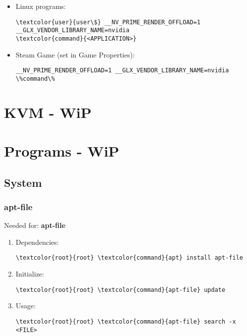 \documentclass[10pt, a4paper, onecolumn, openany]{book} %
\begin{document}
\begin{enumerate}
\begin{itemize}
    \item Linux programs:
\begin{Verbatim}[commandchars=\\\{\}]
\textcolor{user}{user\$} __NV_PRIME_RENDER_OFFLOAD=1 __GLX_VENDOR_LIBRARY_NAME=nvidia 
\textcolor{command}{<APPLICATION>}
\end{Verbatim}
    \item Steam Game (set in Game Properties):
\begin{Verbatim}[commandchars=\\\{\}]
__NV_PRIME_RENDER_OFFLOAD=1 __GLX_VENDOR_LIBRARY_NAME=nvidia \%command\%
\end{Verbatim}
\end{itemize}
\end{enumerate}
\chapter{KVM - WiP}
\chapter{Programs - WiP}
\section{System}
\subsection{apt-file}
Needed for: \textbf{apt-file}
\begin{enumerate}
    \item Dependencies:
\begin{Verbatim}[commandchars=\\\{\}]
\textcolor{root}{root} \textcolor{command}{apt} install apt-file
\end{Verbatim}
    \item Initialize:
\begin{Verbatim}[commandchars=\\\{\}]
\textcolor{root}{root} \textcolor{command}{apt-file} update
\end{Verbatim}
    \item Usage:
\begin{Verbatim}[commandchars=\\\{\}]
\textcolor{root}{root} \textcolor{command}{apt-file} search -x <FILE>
\end{Verbatim}
\end{enumerate}
\end{document}

